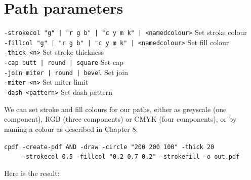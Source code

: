 \documentclass{book}
\begin{document}
\section{Path parameters}
  {\small\begin{framed}
   \noindent\verb!-strokecol "g" | "r g b" | "c y m k" | <namedcolour>! Set stroke colour\\
   \noindent\verb!-fillcol "g" | "r g b" | "c y m k" | <namedcolour>! Set fill colour\\
   \noindent\verb!-thick <n>! Set stroke thickness\\
   \noindent\verb!-cap butt | round | square! Set cap\\
   \noindent\verb!-join miter | round | bevel! Set join\\
   \noindent\verb!-miter <n>! Set miter limit\\
   \noindent\verb!-dash <pattern>! Set dash pattern
  \end{framed}}

We can set stroke and fill colours for our paths, either as greyscale (one component), RGB (three components) or CMYK (four components), or by naming a colour as described in Chapter 8:

\begin{framed}
 \noindent\small\verb?cpdf -create-pdf AND -draw -circle "200 200 100" -thick 20?\\
 \noindent\small\verb?     -strokecol 0.5 -fillcol "0.2 0.7 0.2" -strokefill -o out.pdf?
\end{framed}

\noindent Here is the result:
\end{document}
